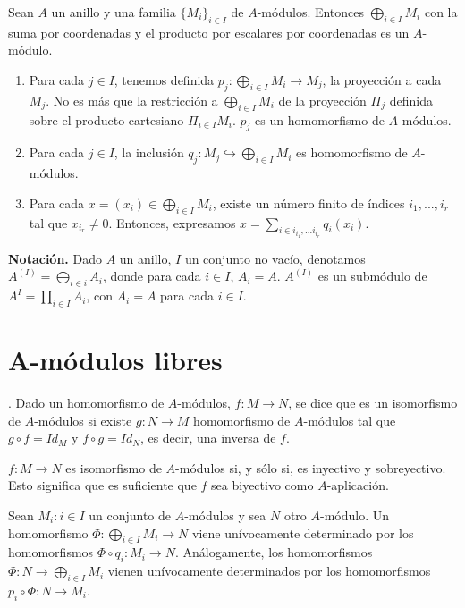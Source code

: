 \documentclass[../main.tex]{subfiles}
\begin{document}
\begin{proposition}
	Sean $A$ un anillo y una familia $\{M_i\}_{i\in I}$ de $A$-módulos. Entonces $\bigoplus_{i\in I}M_i$ con la suma por coordenadas y el producto por escalares por coordenadas es un $A$-módulo.
\end{proposition}

\begin{remark}
	\begin{enumerate}
		\item Para cada $j\in I$, tenemos definida $p_j:\bigoplus_{i\in I}M_i\rightarrow M_j$, la proyección a cada $M_j$. No es más que la restricción a $\bigoplus_{i\in I}M_i$ de la proyección $\Pi_j$ definida sobre el producto cartesiano $\Pi_{i\in I}M_i$. $p_j$ es un homomorfismo de $A$-módulos.
		\item Para cada $j\in I$, la inclusión $q_j:M_j \hookrightarrow \bigoplus_{i\in I}M_i$ es homomorfismo de $A$-módulos.
		\item  Para cada $x=(x_i)\in \bigoplus_{i\in I}M_i$, existe un número finito de índices $i_1,...,i_r$ tal que $x_{i_r}\neq 0$. Entonces, expresamos $x=\sum_{i\in {i_{i_1},...i_{i_r}}} q_i(x_i)$.
	\end{enumerate}
\end{remark}

\textbf{Notación.} Dado $A$ un anillo, $I$ un conjunto no vacío, denotamos $A^{(I)}=\bigoplus_{i\in i} A_i$, donde para cada $i\in I$, $A_i=A$. $A^{(I)}$ es un submódulo de $A^{I} = \prod_{i\in I} A_i$, con $A_i=A$ para cada $i\in I$.

\section{A-módulos libres}

\begin{definition}. Dado un homomorfismo de $A$-módulos, $f:M\rightarrow N$, se dice que es un isomorfismo de $A$-módulos si existe $g:N\rightarrow M$ homomorfismo de $A$-módulos tal que $g\circ f = Id_M$ y $f\circ g = Id_N$, es decir, una inversa de $f$.
\end{definition}

\begin{remark} $f:M\longrightarrow N$ es isomorfismo de $A$-módulos si, y sólo si, es inyectivo y sobreyectivo. Esto significa que es suficiente que $f$ sea biyectivo como $A$-aplicación.
\end{remark}

\begin{lemma} Sean ${M_i:i\in I}$ un conjunto de $A$-módulos y sea $N$ otro $A$-módulo. Un homomorfismo $\Phi:\bigoplus_{i\in I} M_i \rightarrow N$ viene unívocamente determinado por los homomorfismos $\Phi \circ q_i:M_i \rightarrow N$. Análogamente, los homomorfismos $\Phi:N\rightarrow \bigoplus_{i\in I} M_i$ vienen unívocamente determinados por los homomorfismos $p_i\circ \Phi:N\rightarrow M_i$.
\end{lemma}
\end{document}
